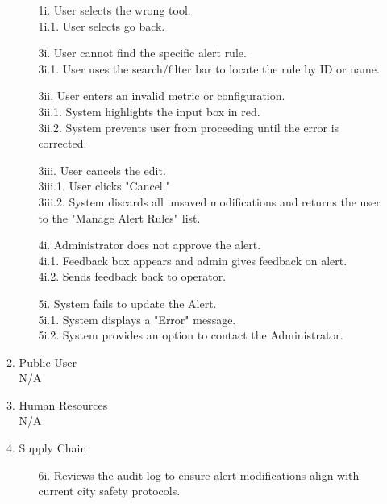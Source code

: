 \documentclass[]{article}
\begin{document}
\begin{enumerate}[{\bf BE1.}]
\begin{enumerate}[{\bf VP1.}]
\begin{itemize}
				\item[1i.] User selects the wrong tool. \\
				\hspace{1cm}1i.1. User selects go back.
				\item[3i.] User cannot find the specific alert rule. \\
				\hspace{1cm}3i.1. User uses the search/filter bar to locate the rule by ID or name.
				\item[3ii.] User enters an invalid metric or configuration. \\
				\hspace{1cm}3ii.1. System highlights the input box in red. \\
				\hspace{1cm}3ii.2. System prevents user from proceeding until the error is corrected.
				\item[3iii.] User cancels the edit. \\
				\hspace{1cm}3iii.1. User clicks "Cancel." \\
				\hspace{1cm}3iii.2. System discards all unsaved modifications and returns the user to the "Manage Alert Rules" list.
				\item[4i.] Administrator does not approve the alert. \\
				\hspace{1cm}4i.1. Feedback box appears and admin gives feedback on alert. \\
				\hspace{1cm}4i.2. Sends feedback back to operator.
				\item[5i.] System fails to update the Alert. \\
				\hspace{1cm}5i.1. System displays a "Error" message. \\
				\hspace{1cm}5i.2. System provides an option to contact the Administrator.
			\end{itemize}
		\item Public User \\
			N/A
		\item Human Resources \\
			N/A
		\item Supply Chain
			\begin{itemize}
				\item[6i.] Reviews the audit log to ensure alert modifications align with current city safety protocols.

\end{itemize}
\end{enumerate}
\end{enumerate}
\end{document}
